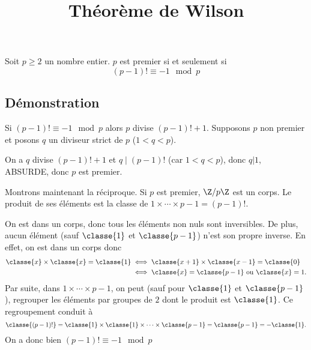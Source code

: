 \documentclass[fontsize=12pt,twoside=false,parskip=half, french]{scrartcl}
\title{Théorème de Wilson}
\date{}
\author{}
\begin{document}
\maketitle
   \begin{Theoreme}
      Soit $p \geq 2$ un nombre entier. $p$ est premier si et seulement si
      \[
         (p - 1)! \equiv -1 \mod p
      \]
   \end{Theoreme}
   \subsection{Démonstration}
      Si $(p - 1)! \equiv -1 \mod p$ alors $p$ divise $(p - 1)! + 1$. Supposons $p$ non premier et posons $q$
      un diviseur strict de $p$ ($1 < q < p$).
      
      On a $q$ divise $(p - 1)! + 1$ et $q \mid (p - 1)!$ (car $1 < q < p$), donc $q | 1$, ABSURDE, donc $p$ 
      est premier.
      
      Montrons maintenant la réciproque. Si $p$ est premier, $\Z/p\Z$ est un corps. Le produit
      de ses éléments est la classe de $1 \times \cdots \times p - 1 = (p - 1)!$.
      
      On est dans un corps, donc tous les éléments non nuls sont inversibles. De plus, aucun élément (sauf $\classe{1}$ 
      et $\classe{p - 1}$) n’est son propre inverse. En effet, on est dans un corps donc
      \begin{align*}
         \classe{x} \times \classe{x} = \classe{1} &\iff \classe{x + 1} \times \classe{x - 1} = \classe{0}\\
                                                   &\iff \classe{x} = \classe{p - 1} \text{ ou } \classe{x} = 1.
      \end{align*}
      Par suite, dans $1 \times \cdots \times p - 1$, on peut (sauf pour $\classe{1}$ et $\classe{p - 1}$), 
      regrouper les éléments par groupes de $2$ dont le produit est $\classe{1}$. Ce regroupement conduit à
      \[
         \classe{(p - 1)!} = \classe{1} \times \classe{1} \times \cdots \times \classe{p - 1} = \classe{p - 1} = -\classe{1}.
      \]
      On a donc bien $(p - 1)! \equiv -1 \mod p$
\end{document}
